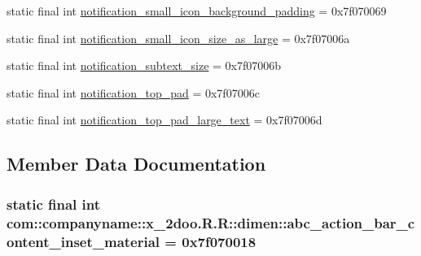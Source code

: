 \begin{CompactItemize}
static final int \hyperlink{classcom_1_1companyname_1_1x__2doo_1_1_r_1_1dimen_f65b87d146d65a270feec21805275a81}{notification\_\-small\_\-icon\_\-background\_\-padding} = 0x7f070069
\item 
static final int \hyperlink{classcom_1_1companyname_1_1x__2doo_1_1_r_1_1dimen_55557681c0fdc8b7c3c522c658eba3a7}{notification\_\-small\_\-icon\_\-size\_\-as\_\-large} = 0x7f07006a
\item 
static final int \hyperlink{classcom_1_1companyname_1_1x__2doo_1_1_r_1_1dimen_0f3e4969e6e4ded00037a601509f84d7}{notification\_\-subtext\_\-size} = 0x7f07006b
\item 
static final int \hyperlink{classcom_1_1companyname_1_1x__2doo_1_1_r_1_1dimen_fb3fb8c681433825afa68c88accfe04c}{notification\_\-top\_\-pad} = 0x7f07006c
\item 
static final int \hyperlink{classcom_1_1companyname_1_1x__2doo_1_1_r_1_1dimen_6166476cebb8c7a23444fa94030a05cd}{notification\_\-top\_\-pad\_\-large\_\-text} = 0x7f07006d
\end{CompactItemize}


\subsection{Member Data Documentation}
\hypertarget{classcom_1_1companyname_1_1x__2doo_1_1_r_1_1dimen_26d64e6426dd7c320c887b8cb109e13b}{
\subsubsection[{abc\_\-action\_\-bar\_\-content\_\-inset\_\-material}]{\setlength{\rightskip}{0pt plus 5cm}static final int com::companyname::x\_\-2doo.R.R::dimen::abc\_\-action\_\-bar\_\-content\_\-inset\_\-material = 0x7f070018}}
\label{classcom_1_1companyname_1_1x__2doo_1_1_r_1_1dimen_26d64e6426dd7c320c887b8cb109e13b}


